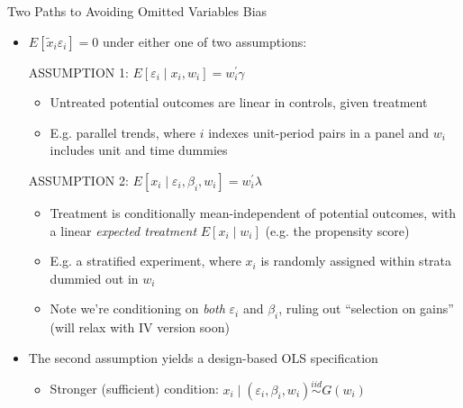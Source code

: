 \documentclass[11pt,english]{beamer}
\begin{document}
\begin{frame}{Two Paths to Avoiding Omitted Variables Bias}

\begin{itemize}
\item $E[\tilde{x}_i\varepsilon_i]=0$ under either one of two assumptions:
\bigskip\pause{}

ASSUMPTION 1: $E[\varepsilon_i\mid x_i,w_i]=w_i^\prime\gamma$
\smallskip
\begin{itemize}
\item Untreated potential outcomes are linear in controls, given treatment\smallskip
\item E.g. parallel trends, where $i$ indexes unit-period pairs in a panel and $w_i$ includes unit and time dummies
\end{itemize}
\bigskip\pause{}

ASSUMPTION 2: $E[x_i\mid \varepsilon_i,\beta_i,w_i]=w_i^\prime\lambda$
\smallskip
\begin{itemize}
\item Treatment is conditionally mean-independent
of potential outcomes, with a linear \emph{expected
treatment} $E[x_i\mid w_i]$ (e.g. the propensity score)\smallskip
\item E.g. a stratified experiment, where $x_i$ is randomly assigned within strata dummied out in $w_i$ \smallskip
\item Note we're conditioning on \emph{both} $\varepsilon_i$ and $\beta_i$, ruling out ``selection on gains'' (will relax with IV version soon)
\end{itemize}
\bigskip\pause{}

\item The second assumption yields a design-based OLS specification\smallskip
\begin{itemize}
\item Stronger (sufficient) condition: $x_i\mid (\varepsilon_i,\beta_i,w_i)\stackrel{iid}{\sim} G(w_i)$
\end{itemize}
\end{itemize}

\end{frame}
\end{document}
